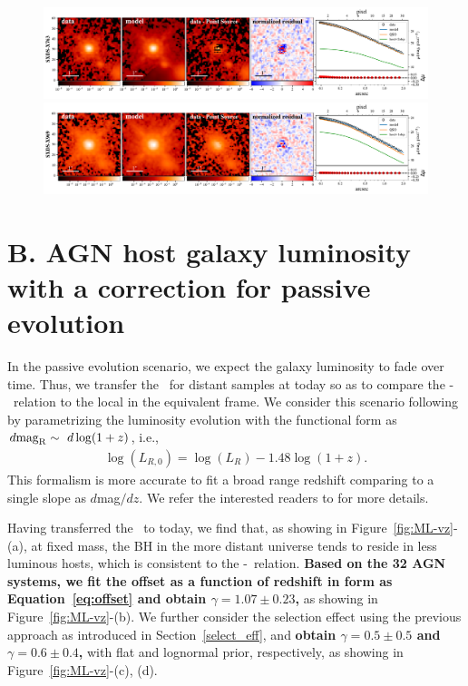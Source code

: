 \documentclass[apj]{emulateapj}
\begin{document}
\begin{figure}
\centering
{
\includegraphics[height=0.25\textwidth]{fig/best_fit_SXDS-X763_SB_profile.pdf}
\includegraphics[height=0.25\textwidth]{fig/best_fit_SXDS-X969_SB_profile.pdf}
}
\end{figure} 

\clearpage
\section{B. AGN host galaxy luminosity with a correction for passive evolution}\label{sec:ml-ev}
In the passive evolution scenario, we expect the galaxy luminosity to fade over time. Thus, we transfer the \lhost\ for distant samples at today so as to compare the \mbh-\lhost\ relation to the local in the equivalent frame.
We consider this scenario following \citet{Ding2017b} by parametrizing the luminosity evolution with the functional form as
$d{\rm mag}_{\rm R}\sim~d\log(1+z)$, i.e.,
\begin{eqnarray}
\label{eq:L_relation}
\log(L_{R,0})=\log(L_{R}) - 1.48 \log (1+z).
\end{eqnarray} 
This formalism is more accurate to fit a broad range redshift comparing to a single slope as $d$mag$/dz$. We refer the interested readers to \citet[][section 5.4]{Ding2017b} for more details.

Having transferred the \lhost\ to today, we find that, as showing in Figure~\ref{fig:ML-vz}-(a), at fixed mass, the BH in the more distant universe tends to reside in less luminous hosts, which is consistent to the \mbh-\smass\ relation. {\bf Based on the 32 AGN systems, we fit the offset as a function of redshift in form as Equation~\ref{eq:offset} and obtain $\gamma = 1.07\pm0.23$, } as showing in Figure~\ref{fig:ML-vz}-(b). We further consider the selection effect using the previous approach as introduced in Section~\ref{select_eff}, and {\bf obtain $\gamma = 0.5\pm0.5$ and $\gamma = 0.6\pm0.4$, }with flat and lognormal prior, respectively, as showing in Figure~\ref{fig:ML-vz}-(c), (d).
\end{document}
